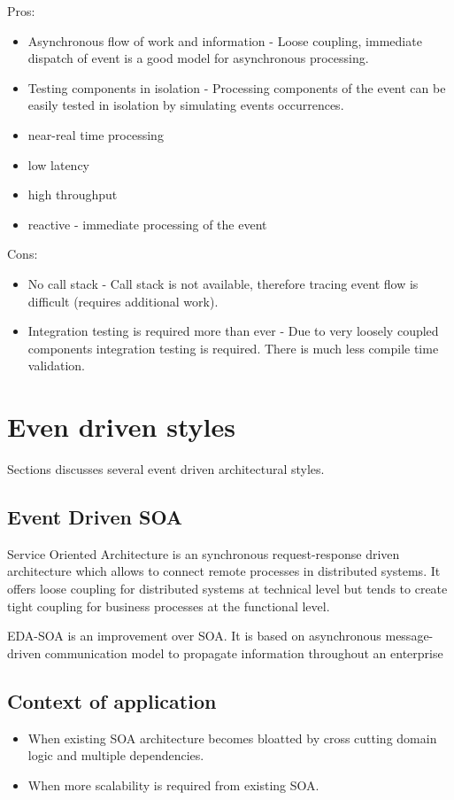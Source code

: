 \documentclass[12pt, a4paper]{article}
\begin{document}
Pros:
\begin{itemize}
\item Asynchronous flow of work and information - Loose coupling, immediate dispatch of event is a good model for asynchronous processing.
\item Testing components in isolation - Processing components of the event can be easily tested in isolation by simulating events occurrences.
\item near-real time processing
\item low latency
\item high throughput
\item reactive - immediate processing of the event
\end{itemize}

Cons:
\begin{itemize}
\item No call stack - Call stack is not available, therefore tracing event flow is difficult (requires additional work).
\item Integration testing is required more than ever - Due to very loosely coupled components integration testing is required. There is much less compile time validation.
\end{itemize}

\section{Even driven styles}
Sections discusses several event driven architectural styles.

\subsection{Event Driven SOA}
Service Oriented Architecture is an synchronous request-response driven architecture which allows to connect remote processes in distributed systems. It offers loose coupling for distributed systems at technical level but tends to create tight coupling for business processes at the functional level.

EDA-SOA is an improvement over SOA. It is based on asynchronous message-driven communication model to propagate information throughout an enterprise

\subsection{Context of application}
\begin{itemize}
\item When existing SOA architecture becomes bloatted by cross cutting domain logic and multiple dependencies.
\item When more scalability is required from existing SOA.
\end{itemize}
\end{document}
